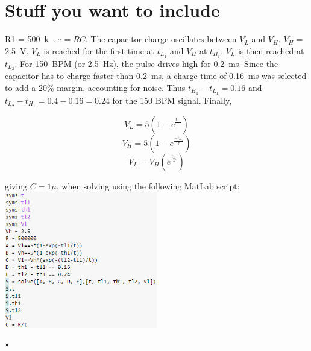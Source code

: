      \chapter{Stuff you want to include}
R1 = \SI{500}{k\Omega}. $\tau = RC$. The capacitor charge oscillates between $V_L$ and $V_H$. $V_H =$ \SI{2.5}{V}. $V_L$ is reached for the first time at $t_{L_1}$ and $V_H$ at $t_{H_1}$. $V_L$ is then reached at  $t_{L_2}$. For \SI{150}{BPM} (or \SI{2.5}{Hz}), the pulse drives high for \SI{0.2}{ms}. Since the capacitor has to charge faster than \SI{0.2}{ms}, a charge time of \SI{0.16}{ms} was selected to add a 20\% margin, accounting for noise. Thus $t_{H_1} - t_{L_1} = 0.16$ and $t_{L_2} - t_{H_1} = 0.4 - 0.16 = 0.24$ for the 150 BPM signal. Finally,

$$V_L = 5\left(1-e^{\frac{t_{L_1}}{\tau}}\right)$$
$$V_H = 5\left(1-e^{\frac{-t_{H_1}}{\tau}}\right)$$
$$V_L = V_H\left(e^{\frac{t_{L_1}}{\tau}}\right)$$

giving $C = 1\mu$, when solving using the following MatLab script:\\

\includegraphics[width = 0.5\textwidth]{./Figures/script}

\texttt{•}